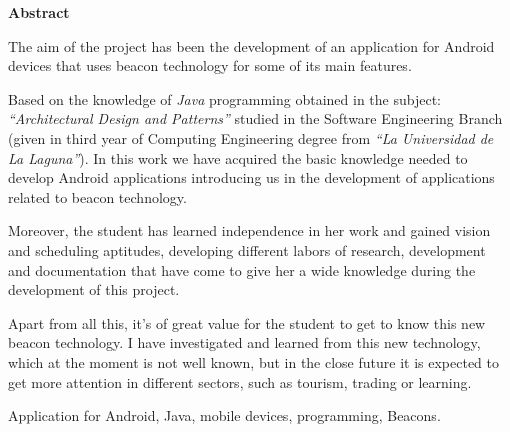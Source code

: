 \documentclass[spanish,a4paper,12pt,oneside]{extreport}
\newenvironment{summary}
{\par\noindent\begin{center}\textbf{Abstract}\end{center}\begin{itshape}\par\noindent}
{\end{itshape}}
\newenvironment{keywords}
{\begin{list}{}{\setlength{\leftmargin}{1em}}\item[\hskip\labelsep \bfseries Keywords:]}
{\end{list}}
\begin{document}
\newpage  %
\begin{summary}
{\em

The aim of the project has been the development of an application for Android devices that uses beacon technology for some of its main features.

\bigskip
Based on the knowledge of \textit{Java} programming obtained in the subject: \textit{``Architectural Design and Patterns''} studied in the
Software Engineering Branch (given in third year of Computing Engineering degree from \textit{``La Universidad de La Laguna''}). In this work we have acquired the basic knowledge needed to develop Android applications introducing us in the development of applications related to beacon technology.

\bigskip
Moreover, the student has learned independence in her work and gained vision and scheduling aptitudes, developing different labors of research, development and documentation that have come to give her a wide knowledge during the development of this project.

\bigskip
Apart from all this, it's of great value for the student to get to know this new beacon technology. I have investigated and learned from this new technology, which at the moment is not well known, but in the close future it is expected to get more attention in different sectors, such as tourism, trading or learning.
}

\begin{keywords}
Application for Android, Java, mobile devices, programming, Beacons.
\end{keywords}

\end{summary}

\newpage{\pagestyle{empty}}
\thispagestyle{empty}



\pagestyle{myheadings} %

\renewcommand{\thepage}{\roman{page}}
\setcounter{page}{1}
\end{document}
